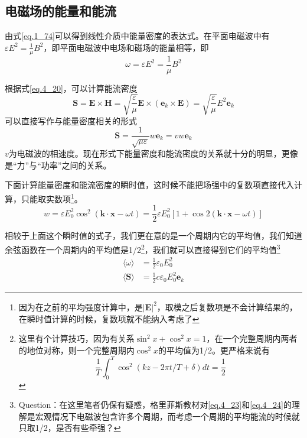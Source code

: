     \subsection{电磁场的能量和能流}      
        由式\ref{eq.1_74}可以得到线性介质中能量密度的表达式。在平面电磁波中有$\varepsilon E^2 =\frac{1}{\mu}B^2$，即平面电磁波中电场和磁场的能量相等，即
        \begin{equation}
            \omega = \varepsilon E^2 =\frac{1}{\mu}B^2
        \end{equation}

        根据式\ref{eq.4_20}，可以计算能流密度
        \begin{equation}
            \label{eq.4_23}
            \boldsymbol{S}=\boldsymbol{E} \times \boldsymbol{H}=\sqrt{\frac{\varepsilon}{\mu}} \boldsymbol{E} \times\left(\boldsymbol{e}_{k} \times \boldsymbol{E}\right)=\sqrt{\frac{\varepsilon}{\mu}} E^{2} \boldsymbol{e}_{k}
        \end{equation}
        可以直接写作与能量密度相关的形式
        \begin{equation}
            \label{eq.4_24}
            \boxed{\boldsymbol{S}=\frac{1}{\sqrt{\mu \varepsilon}} w \boldsymbol{e}_{k}=v w \boldsymbol{e}_{k}}
        \end{equation}
        $v$为电磁波的相速度。现在形式下能量密度和能流密度的关系就十分的明显，更像是“力”与“功率”之间的关系。

        下面计算能量密度和能流密度的瞬时值，这时候不能把场强中的复数项直接代入计算，只能取实数项\footnote{因为在之前的平均强度计算中，是$|\boldsymbol{E}|^2$，取模之后复数项是不会计算结果的，在瞬时值计算的时候，复数项就不能纳入考虑了}。
        \begin{equation}
            w=\varepsilon E_{0}^{2} \cos ^{2}(\boldsymbol{k} \cdot \boldsymbol{x}-\omega t)=\frac{1}{2} \varepsilon E_{0}^{2}[1+\cos 2(\boldsymbol{k} \cdot \boldsymbol{x}-\omega t)]
        \end{equation}
        
        相较于上面这个瞬时值的式子，我们更在意的是一个周期内它的平均值，我们知道余弦函数在一个周期内的平均值是1/2\footnote{这里有个计算技巧，因为有关系$\sin^2 x + \cos^2 x =1 $，在一个完整周期内两者的地位对称，则一个完整周期内$\cos^2 x$的平均值为1/2。更严格来说有\[\frac{1}{T} \int_{0}^{T} \cos ^{2}(k z-2 \pi t / T+\delta) d t=\frac{1}{2}\]}，我们就可以直接得到它们的平均值\footnote{\textcolor[RGB]{143,143,143}{Question：在这里笔者仍保有疑惑，格里菲斯教材对\ref{eq.4_23}和\ref{eq.4_24}的理解是宏观情况下电磁波包含许多个周期，而考虑一个周期的平均能流的时候就只取1/2，是否有些牵强？}}
        \begin{equation}
            \boxed{\begin{aligned}
            \langle \omega \rangle &=\frac{1}{2} \varepsilon_{0} E_{0}^{2} \\
            \langle\boldsymbol{S}\rangle &=\frac{1}{2} c \varepsilon_{0} E_{0}^{2} \boldsymbol{e}_k
            \end{aligned}}
        \end{equation}
